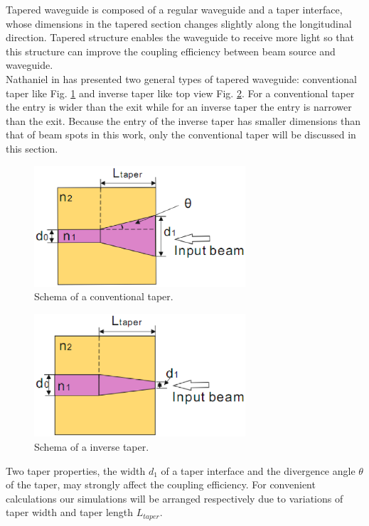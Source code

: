 Tapered waveguide is composed of a regular waveguide and a taper interface, whose dimensions in the tapered section changes slightly along the longitudinal direction\cite{linear_tapered_waveguides}. Tapered structure enables the waveguide to receive more light so that this structure can improve the coupling efficiency between beam source and waveguide.\\  

Nathaniel in \cite{design_fabrication_tapered_waveguide} has presented two general types of tapered waveguide: conventional taper like Fig. \ref{fig:conventional_taper} and inverse taper like top view Fig. \ref{fig:inverse_taper}. For a conventional taper the entry is wider than the exit while for an inverse taper the entry is narrower than the exit. Because the entry of the inverse taper has smaller dimensions than that of beam spots in this work, only the conventional taper will be discussed in this section.\\

\begin{figure}[!ht]
\centering
\includegraphics[width=0.7\textwidth]{bilder/convernational_taper}
\caption{Schema of a conventional taper.}
\label{fig:conventional_taper}
\end{figure}
\begin{figure}[!ht]
\centering
\includegraphics[width=0.7\textwidth]{bilder/inverse_taper}
\caption{Schema of a inverse taper.}
\label{fig:inverse_taper}
\end{figure}
Two taper properties, the width $d_{1}$ of a taper interface and the divergence angle $\theta$ of the taper, may strongly affect the coupling efficiency. For convenient calculations our simulations will be arranged respectively due to variations of taper width and taper length $L_{taper}$.
